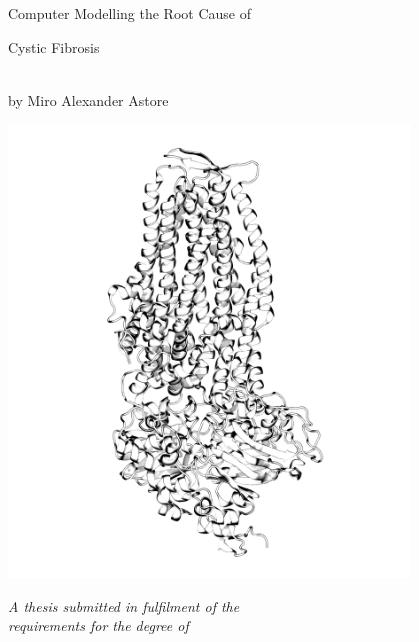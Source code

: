 
\begin{titlepage}

\begin{center}


\begin{LARGE}
Computer Modelling the Root Cause of  \\ 
\end{LARGE}
\vspace*{0.1in}
\begin{LARGE}
Cystic Fibrosis
\end{LARGE}
\begin{large} \\
\vspace{0.1in}
by Miro Alexander Astore

\includegraphics[width=0.8\textwidth]{figures/skeleton_bw.png}

\textit{A thesis submitted in fulfilment of the}\\
\textit{requirements for the degree of}


\end{large}
\end{center}
\end{titlepage}
